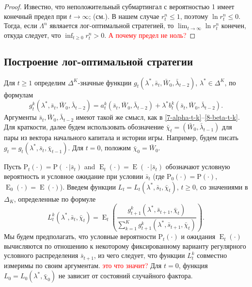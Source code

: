 \documentclass[a4paper,12pt,russian]{article} %
\theoremstyle{definition}
\DeclareMathOperator{\E}{E}
\renewcommand{\P}{\mathrm{P}}
\begin{document}
\begin{proof}
Известно, что неположительный субмартингал с вероятностью 1 имеет конечный предел при $t\to\infty$; (см.\cite[Ch.~7.4]{Shiryaev2019}). В нашем случае $r_t^n \leq 1$, поэтому $\ln r_t^n \leq 0$.
Тогда, если $\Lambda^n$ являается лог-оптимальной стратегией, то $\lim_{t\to\infty} \ln r_t^n$ конечен, откуда следует, что $\inf_{t\ge0} r_t^n > 0$. \textcolor{red} {А почему предел не ноль?}
\end{proof}


\subsection{Построение лог-оптимальной стратегии}
\label{section3-2-construction-log-optimal}
Для $t\ge 1$ определим $\Delta^K$-значные функции $g_t(\lambda^*,\bar s_t,\bar W_0, \bar\lambda_{t-2})$, $\lambda^*\in \Delta^K$, по формулам 
\[
g_{t}^k(\lambda^*, \bar s_t, \bar W_0,\bar\lambda_{t-2}) 
= a_{t}^k(\bar s_t,\bar W_0,\bar\lambda_{t-2}) + \lambda^* b_{t}^k(\bar s_t,\bar W_0,\bar\lambda_{t-2}).
\]
Аргументы $\bar s_t, \bar W_0,\bar \lambda_{t-2}$ имеют такой же смысл, как в \eqref{7-alpha-t-k}--\eqref{8-beta-t-k}.
Для краткости, далее будем использовать обозначение $\bar \chi_t=(\bar W_0,\bar\lambda_{t-1})$ для пары из вектора начального капитала и истории игры.
Например, будем писать $g_t = g_t(\lambda^*,\bar s_t,\bar \chi_{t-1})$.
Для $t=0$, положим $\bar\chi_0 = \bar W_0$. 

Пусть $\P_t(\cdot) = \P(\,\cdot\mid \bar s_t)$ and $\E_t(\cdot) = \E(\,\cdot\mid \bar s_t)$ обозначают условную вероятность и условное ожидание при условии $\bar s_t$ (где $\P_0(\cdot) = \P(\cdot)$, $\E_0(\cdot) = \E(\cdot)$).
Введем функции $L_t = L_t(\lambda^*, \bar s_t, \bar\chi_t)$, $t\ge0$, со значениями в $\Delta_K$,
определенные по формуле
\[
L_{t}^k(\lambda^*, \bar s_t,\bar\chi_t) 
= \E_t\left(
  \frac{g_{t+1}^k(\lambda^*,\bar s_{t+1},\bar\chi_t)}
       {\sum_{k=1}^K g_{t+1}^k(\lambda^*,\bar s_{t+1},\bar\chi_t)} 
  \right).
\]
Мы будем предполагать, что условные вероятности $\P_t(\cdot)$ и ожидания $\E_t(\cdot)$ вычисляются по отношению к некоторому фиксированному варианту регулярного условного распределения $\bar s_{t+1}$, из чего следует, что функции $L_{t}^k$ совместно измеримы по своим аргументам. \textcolor{red} { это что значит?}
Для $t=0$, функция $L_0 = L_0(\lambda^*,\bar\chi_0)$ не зависит от состояний случайного фактора. 
\end{document}
